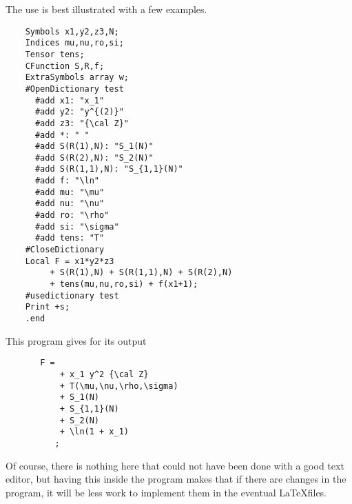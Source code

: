 The use is best illustrated with a few examples.
\begin{verbatim}
    Symbols x1,y2,z3,N;
    Indices mu,nu,ro,si;
    Tensor tens;
    CFunction S,R,f;
    ExtraSymbols array w;
    #OpenDictionary test
      #add x1: "x_1"
      #add y2: "y^{(2)}"
      #add z3: "{\cal Z}"
      #add *: " "
      #add S(R(1),N): "S_1(N)"
      #add S(R(2),N): "S_2(N)"
      #add S(R(1,1),N): "S_{1,1}(N)"
      #add f: "\ln"
      #add mu: "\mu"
      #add nu: "\nu"
      #add ro: "\rho"
      #add si: "\sigma"
      #add tens: "T"
    #CloseDictionary
    Local F = x1*y2*z3
         + S(R(1),N) + S(R(1,1),N) + S(R(2),N)
         + tens(mu,nu,ro,si) + f(x1+1);
    #usedictionary test
    Print +s;
    .end
\end{verbatim}
This program gives for its output
\begin{verbatim}
       F =
           + x_1 y^2 {\cal Z}
           + T(\mu,\nu,\rho,\sigma)
           + S_1(N)
           + S_{1,1}(N)
           + S_2(N)
           + \ln(1 + x_1)
          ;
\end{verbatim}
Of course, there is nothing here that could not have been done with a good 
text editor, but having this inside the \FORM program makes that if there 
are changes in the \FORM program, it will be less work to implement them in 
the eventual \LaTeX files.

